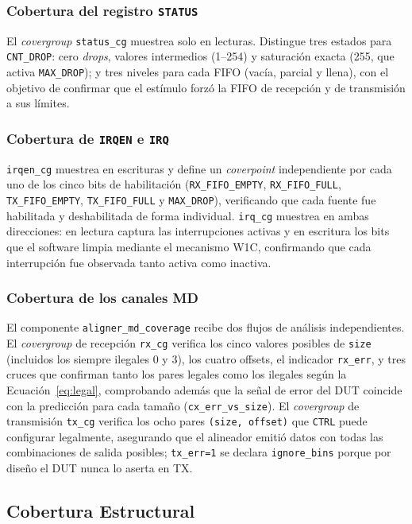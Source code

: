 \documentclass[conference]{IEEEtran}
\begin{document}
\subsubsection{Cobertura del registro \texttt{STATUS}}
El \textit{covergroup} \texttt{status\_cg} muestrea solo en lecturas.
Distingue tres estados para \texttt{CNT\_DROP}: cero \textit{drops}, valores
intermedios (1--254) y saturación exacta (255, que activa \texttt{MAX\_DROP});
y tres niveles para cada FIFO (vacía, parcial y llena), con el objetivo de
confirmar que el estímulo forzó la FIFO de recepción y de transmisión a sus
límites.

\subsubsection{Cobertura de \texttt{IRQEN} e \texttt{IRQ}}
\texttt{irqen\_cg} muestrea en escrituras y define un \textit{coverpoint}
independiente por cada uno de los cinco bits de habilitación
(\texttt{RX\_FIFO\_EMPTY}, \texttt{RX\_FIFO\_FULL}, \texttt{TX\_FIFO\_EMPTY},
\texttt{TX\_FIFO\_FULL} y \texttt{MAX\_DROP}), verificando que cada fuente fue
habilitada y deshabilitada de forma individual. \texttt{irq\_cg} muestrea en
ambas direcciones: en lectura captura las interrupciones activas y en escritura
los bits que el software limpia mediante el mecanismo W1C, confirmando que cada
interrupción fue observada tanto activa como inactiva.

\subsubsection{Cobertura de los canales MD}
El componente \texttt{aligner\_md\_coverage} recibe dos flujos de análisis
independientes. El \textit{covergroup} de recepción \texttt{rx\_cg} verifica
los cinco valores posibles de \texttt{size} (incluidos los siempre ilegales
0 y 3), los cuatro offsets, el indicador \texttt{rx\_err}, y tres cruces que
confirman tanto los pares legales como los ilegales según la
Ecuación~\eqref{eq:legal}, comprobando además que la señal de error del DUT
coincide con la predicción para cada tamaño (\texttt{cx\_err\_vs\_size}). El
\textit{covergroup} de transmisión \texttt{tx\_cg} verifica los ocho pares
\texttt{(size, offset)} que \texttt{CTRL} puede configurar legalmente,
asegurando que el alineador emitió datos con todas las combinaciones de salida
posibles; \texttt{tx\_err=1} se declara \texttt{ignore\_bins} porque por diseño
el DUT nunca lo aserta en TX.

\subsection{Cobertura Estructural}
\label{sec:cov_estructural}
\end{document}
